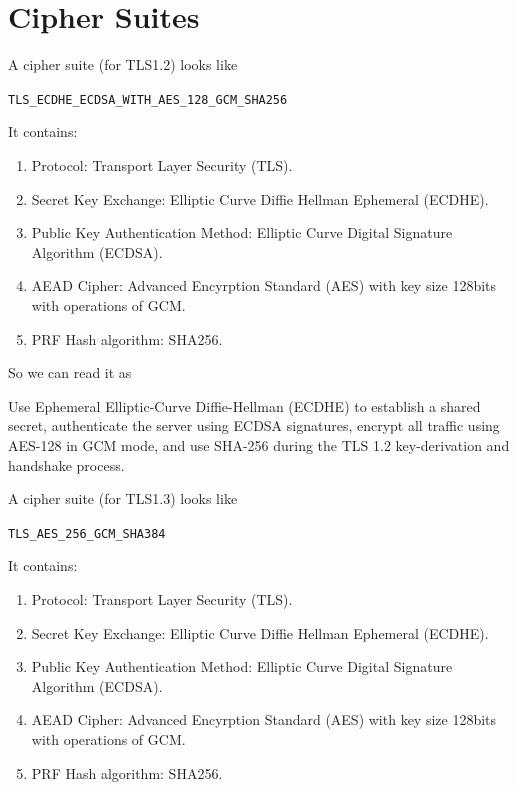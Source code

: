 \documentclass[a4paper, 12pt]{book} %
\begin{document}




\section{Cipher Suites}

A cipher suite (for TLS1.2) looks like
\begin{center}
        \verb|TLS_ECDHE_ECDSA_WITH_AES_128_GCM_SHA256|    
\end{center}
It contains:
\begin{enumerate}
    \item Protocol: Transport Layer Security (TLS).
    \item Secret Key Exchange: Elliptic Curve Diffie Hellman Ephemeral (ECDHE).
    \item Public Key Authentication Method: Elliptic Curve Digital Signature Algorithm (ECDSA).
    \item AEAD Cipher: Advanced Encyrption Standard (AES) with key size 128bits with operations of GCM.
    \item PRF Hash algorithm: SHA256.
\end{enumerate}
So we can read it as 
\begin{center}
    Use Ephemeral Elliptic-Curve Diffie-Hellman (ECDHE) to establish a shared secret, authenticate the server using ECDSA signatures, encrypt all traffic using AES-128 in GCM mode, and use SHA-256 during the TLS 1.2 key-derivation and handshake process.
\end{center}

A cipher suite (for TLS1.3) looks like
\begin{center}
    \verb|TLS_AES_256_GCM_SHA384|
\end{center}
It contains:
\begin{enumerate}
    \item Protocol: Transport Layer Security (TLS).
    \item Secret Key Exchange: Elliptic Curve Diffie Hellman Ephemeral (ECDHE).
    \item Public Key Authentication Method: Elliptic Curve Digital Signature Algorithm (ECDSA).
    \item AEAD Cipher: Advanced Encyrption Standard (AES) with key size 128bits with operations of GCM.
    \item PRF Hash algorithm: SHA256.
\end{enumerate}
\end{document}
